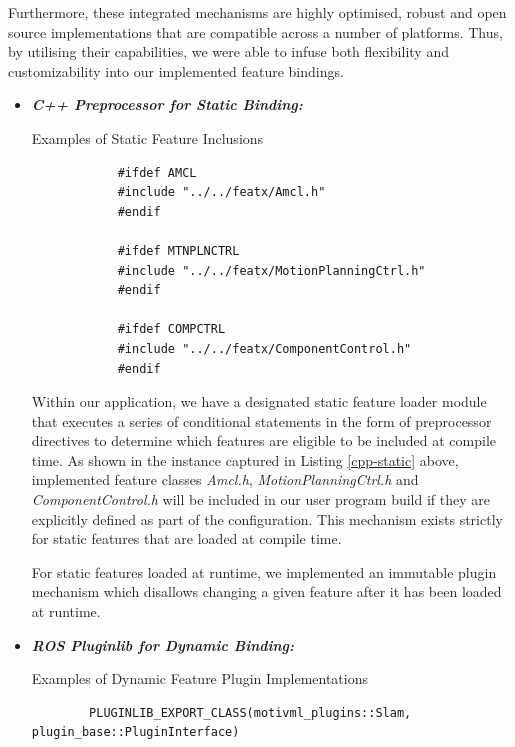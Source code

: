 \documentclass[conference]{IEEEtran}
\begin{document}
Furthermore, these integrated mechanisms are highly optimised, robust and open source implementations that are compatible across a number of platforms. Thus, by utilising their capabilities, we were able to infuse both flexibility and customizability into our implemented feature bindings.
\begin{itemize}
	\item \textit{\textbf{C++ Preprocessor for Static Binding:}}
	\begin{listing}[H]
		\caption{Examples of Static Feature Inclusions}
		\begin{verbatim}
			#ifdef AMCL
			#include "../../featx/Amcl.h"
			#endif
			
			#ifdef MTNPLNCTRL
			#include "../../featx/MotionPlanningCtrl.h"
			#endif
			
			#ifdef COMPCTRL
			#include "../../featx/ComponentControl.h"
			#endif
		\end{verbatim}
		\label{cpp-static}
	\end{listing}

Within our application, we have a designated static feature loader module that executes a series of conditional statements in the form of preprocessor directives to determine which features are eligible to be included at compile time. As shown in the instance captured in Listing \ref{cpp-static} above, implemented feature classes \textit{Amcl.h}, \textit{MotionPlanningCtrl.h} and \textit{ComponentControl.h} will be included in our user program build if they are explicitly defined as part of the configuration. This mechanism exists strictly for static features that are loaded at compile time.

For static features loaded at runtime, we implemented an immutable plugin mechanism which disallows changing a given feature after it has been loaded at runtime.

\item \textit{\textbf{ROS Pluginlib for Dynamic Binding:}}
	\begin{listing}[H]
		\caption{Examples of Dynamic Feature Plugin Implementations}
		\begin{verbatim}
		PLUGINLIB_EXPORT_CLASS(motivml_plugins::Slam, plugin_base::PluginInterface)
		

\end{verbatim}
\end{listing}
\end{itemize}
\end{document}
